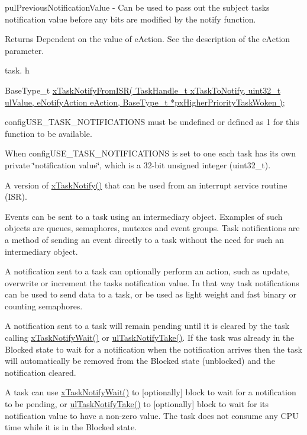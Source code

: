 pul\+Previous\+Notification\+Value -\/ Can be used to pass out the subject task\textquotesingle{}s notification value before any bits are modified by the notify function.

\begin{DoxyReturn}{Returns}
Dependent on the value of e\+Action. See the description of the e\+Action parameter.
\end{DoxyReturn}
task. h 
\begin{DoxyPre}BaseType\_t \hyperlink{task_8h_a1ed9129068b96a909356bd0369c5ecb0}{xTaskNotifyFromISR( TaskHandle\_t xTaskToNotify, uint32\_t ulValue, eNotifyAction eAction, BaseType\_t *pxHigherPriorityTaskWoken )};\end{DoxyPre}


config\+U\+S\+E\+\_\+\+T\+A\+S\+K\+\_\+\+N\+O\+T\+I\+F\+I\+C\+A\+T\+I\+O\+NS must be undefined or defined as 1 for this function to be available.

When config\+U\+S\+E\+\_\+\+T\+A\+S\+K\+\_\+\+N\+O\+T\+I\+F\+I\+C\+A\+T\+I\+O\+NS is set to one each task has its own private \char`\"{}notification value\char`\"{}, which is a 32-\/bit unsigned integer (uint32\+\_\+t).

A version of \hyperlink{task_8h_a0d2d54fb8a64011dfbb54983e4ed06bd}{x\+Task\+Notify()} that can be used from an interrupt service routine (I\+SR).

Events can be sent to a task using an intermediary object. Examples of such objects are queues, semaphores, mutexes and event groups. Task notifications are a method of sending an event directly to a task without the need for such an intermediary object.

A notification sent to a task can optionally perform an action, such as update, overwrite or increment the task\textquotesingle{}s notification value. In that way task notifications can be used to send data to a task, or be used as light weight and fast binary or counting semaphores.

A notification sent to a task will remain pending until it is cleared by the task calling \hyperlink{task_8h_a0475fcda9718f403521c270a7270ff93}{x\+Task\+Notify\+Wait()} or \hyperlink{task_8h_a66540bef602522a01a519f776e4c07d8}{ul\+Task\+Notify\+Take()}. If the task was already in the Blocked state to wait for a notification when the notification arrives then the task will automatically be removed from the Blocked state (unblocked) and the notification cleared.

A task can use \hyperlink{task_8h_a0475fcda9718f403521c270a7270ff93}{x\+Task\+Notify\+Wait()} to \mbox{[}optionally\mbox{]} block to wait for a notification to be pending, or \hyperlink{task_8h_a66540bef602522a01a519f776e4c07d8}{ul\+Task\+Notify\+Take()} to \mbox{[}optionally\mbox{]} block to wait for its notification value to have a non-\/zero value. The task does not consume any C\+PU time while it is in the Blocked state.

